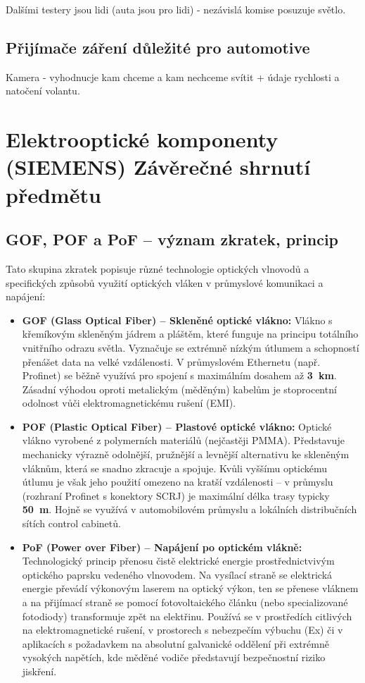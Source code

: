 \documentclass[a4paper, 12pt]{article}
\begin{document}
            Dalšími testery jsou lidi (auta jsou pro lidi) - nezávislá komise posuzuje světlo.
        \subsection{Přijímače záření důležité pro automotive}
            Kamera - vyhodnucje kam chceme a kam nechceme svítit + údaje rychlosti a natočení volantu.

    \section{Elektrooptické komponenty (SIEMENS) Závěrečné shrnutí předmětu}

        \subsection{GOF, POF a PoF – význam zkratek, princip}
        Tato skupina zkratek popisuje různé technologie optických vlnovodů a specifických způsobů využití optických vláken v průmyslové komunikaci a napájení:
        \begin{itemize}
            \item \textbf{GOF (Glass Optical Fiber) – Skleněné optické vlákno:} 
            Vlákno s křemíkovým skleněným jádrem a pláštěm, které funguje na principu totálního vnitřního odrazu světla. Vyznačuje se extrémně nízkým útlumem a schopností přenášet data na velké vzdálenosti. V průmyslovém Ethernetu (např. Profinet) se běžně využívá pro spojení s maximálním dosahem až \textbf{3~km}. Zásadní výhodou oproti metalickým (měděným) kabelům je stoprocentní odolnost vůči elektromagnetickému rušení (EMI).
            
            \item \textbf{POF (Plastic Optical Fiber) – Plastové optické vlákno:} 
            Optické vlákno vyrobené z polymerních materiálů (nejčastěji PMMA). Představuje mechanicky výrazně odolnější, pružnější a levnější alternativu ke skleněným vláknům, která se snadno zkracuje a spojuje. Kvůli vyššímu optickému útlumu je však jeho použití omezeno na kratší vzdálenosti – v průmyslu (rozhraní Profinet s konektory SCRJ) je maximální délka trasy typicky \textbf{50~m}. Hojně se využívá v automobilovém průmyslu a lokálních distribučních sítích control cabinetů.
            
            \item \textbf{PoF (Power over Fiber) – Napájení po optickém vlákně:} 
            Technologický princip přenosu čistě elektrické energie prostřednictvivým optického paprsku vedeného vlnovodem. Na vysílací straně se elektrická energie převádí výkonovým laserem na optický výkon, ten se přenese vláknem a na přijímací straně se pomocí fotovoltaického článku (nebo specializované fotodiody) transformuje zpět na elektřinu. Používá se v prostředích citlivých na elektromagnetické rušení, v prostorech s nebezpečím výbuchu (Ex) či v aplikacích s požadavkem na absolutní galvanické oddělení při extrémně vysokých napětích, kde měděné vodiče představují bezpečnostní riziko jiskření.
        \end{itemize}
\end{document}
